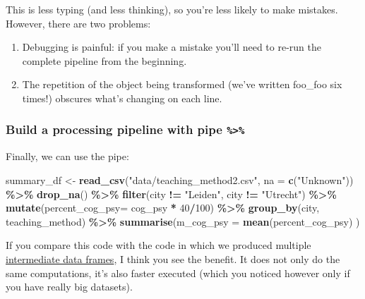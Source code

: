 \documentclass[
]{scrartcl}
\newenvironment{Shaded}{\begin{snugshade}}{\end{snugshade}}
\newcommand{\DataTypeTok}[1]{\textcolor[rgb]{0.13,0.29,0.53}{#1}}
\newcommand{\DecValTok}[1]{\textcolor[rgb]{0.00,0.00,0.81}{#1}}
\newcommand{\KeywordTok}[1]{\textcolor[rgb]{0.13,0.29,0.53}{\textbf{#1}}}
\newcommand{\NormalTok}[1]{#1}
\newcommand{\OperatorTok}[1]{\textcolor[rgb]{0.81,0.36,0.00}{\textbf{#1}}}
\newcommand{\StringTok}[1]{\textcolor[rgb]{0.31,0.60,0.02}{#1}}
\providecommand{\tightlist}{%
  \setlength{\itemsep}{0pt}\setlength{\parskip}{0pt}}
\begin{document}
This is less typing (and less thinking), so you're less likely to make mistakes. However, there are two problems:

\begin{enumerate}
\def\labelenumi{\arabic{enumi}.}
\tightlist
\item
  Debugging is painful: if you make a mistake you'll need to re-run the complete pipeline from the beginning.
\item
  The repetition of the object being transformed (we've written foo\_foo six times!) obscures what's changing on each line.
\end{enumerate}

\hypertarget{build-a-processing-pipeline-with-pipe}{%
\subsubsection{\texorpdfstring{Build a processing pipeline with pipe \texttt{\%\textgreater{}\%}}{Build a processing pipeline with pipe \%\textgreater\%}}\label{build-a-processing-pipeline-with-pipe}}

Finally, we can use the pipe:

\begin{Shaded}
\begin{Highlighting}[]
\NormalTok{summary\_df \textless{}{-}}\StringTok{ }\KeywordTok{read\_csv}\NormalTok{(}\StringTok{"data/teaching\_method2.csv"}\NormalTok{, }\DataTypeTok{na =} \KeywordTok{c}\NormalTok{(}\StringTok{"Unknown"}\NormalTok{)) }\OperatorTok{\%\textgreater{}\%}
\StringTok{        }\KeywordTok{drop\_na}\NormalTok{() }\OperatorTok{\%\textgreater{}\%}
\StringTok{        }\KeywordTok{filter}\NormalTok{(city }\OperatorTok{!=}\StringTok{ "Leiden"}\NormalTok{, city }\OperatorTok{!=}\StringTok{ "Utrecht"}\NormalTok{) }\OperatorTok{\%\textgreater{}\%}
\StringTok{        }\KeywordTok{mutate}\NormalTok{(}\DataTypeTok{percent\_cog\_psy=}\NormalTok{ cog\_psy }\OperatorTok{*}\StringTok{ }\DecValTok{40}\OperatorTok{/}\DecValTok{100}\NormalTok{) }\OperatorTok{\%\textgreater{}\%}
\StringTok{        }\KeywordTok{group\_by}\NormalTok{(city, teaching\_method) }\OperatorTok{\%\textgreater{}\%}
\StringTok{        }\KeywordTok{summarise}\NormalTok{(}\DataTypeTok{m\_cog\_psy =} \KeywordTok{mean}\NormalTok{(percent\_cog\_psy) )}
\end{Highlighting}
\end{Shaded}

If you compare this code with the code in which we produced multiple \protect\hyperlink{intermediatesteps}{intermediate data frames}, I think you see the benefit. It does not only do the same computations, it's also faster executed (which you noticed however only if you have really big datasets).
\end{document}
